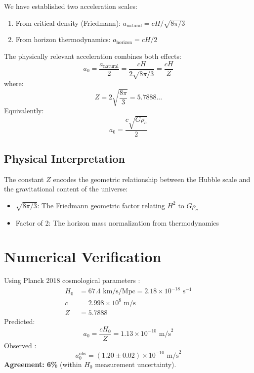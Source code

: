 \documentclass[twocolumn,showpacs,preprintnumbers,amsmath,amssymb,prd]{revtex4-2}
\begin{document}
We have established two acceleration scales:
\begin{enumerate}
\item From critical density (Friedmann): $a_{\text{natural}} = cH/\sqrt{8\pi/3}$
\item From horizon thermodynamics: $a_{\text{horizon}} = cH/2$
\end{enumerate}
The physically relevant acceleration combines both effects:
\begin{equation}
a_0 = \frac{a_{\text{natural}}}{2} = \frac{cH}{2\sqrt{8\pi/3}} = \frac{cH}{Z}
\end{equation}
where:
\begin{equation}
\boxed{Z = 2\sqrt{\frac{8\pi}{3}} = 5.7888...}
\label{eq:Z}
\end{equation}
Equivalently:
\begin{equation}
\boxed{a_0 = \frac{c\sqrt{G\rho_c}}{2}}
\label{eq:a0}
\end{equation}

\subsection{Physical Interpretation}

The constant $Z$ encodes the geometric relationship between the Hubble scale and the gravitational content of the universe:
\begin{itemize}
\item $\sqrt{8\pi/3}$: The Friedmann geometric factor relating $H^2$ to $G\rho_c$
\item Factor of 2: The horizon mass normalization from thermodynamics
\end{itemize}

\section{Numerical Verification}

Using Planck 2018 cosmological parameters \cite{Planck2020}:
\begin{align}
H_0 &= 67.4 \text{ km/s/Mpc} = 2.18\times10^{-18} \text{ s}^{-1} \nonumber\\
c &= 2.998\times10^8 \text{ m/s} \nonumber\\
Z &= 5.7888
\end{align}
Predicted:
\begin{equation}
a_0 = \frac{cH_0}{Z} = 1.13 \times 10^{-10} \text{ m/s}^2
\end{equation}
Observed \cite{McGaugh2016}:
\begin{equation}
a_0^{\text{obs}} = (1.20 \pm 0.02) \times 10^{-10} \text{ m/s}^2
\end{equation}
\textbf{Agreement: 6\%} (within $H_0$ measurement uncertainty).
\end{document}
